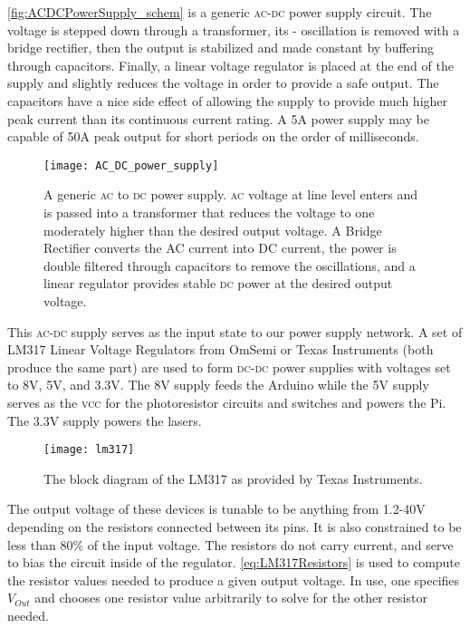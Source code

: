 \documentclass[11pt,oneside,final,letterpaper]{memoir}
\begin{document}
\autoref{fig:ACDCPowerSupply_schem} is a generic \textsc{ac-dc} power supply circuit.  The voltage is stepped down through a transformer, its - oscillation is removed with a bridge rectifier, then the output is stabilized and made constant by buffering through capacitors.  Finally, a linear voltage regulator is placed at the end of the supply and slightly reduces the voltage in order to provide a safe output.  The capacitors have a nice side effect of allowing the supply to provide much higher peak current than its continuous current rating.  A 5A power supply may be capable of 50A peak output for short periods on the order of milliseconds.

\begin{figure}[H]
    \centering
    \texttt{[image: AC\_DC\_power\_supply]}
    \caption[Generic AC-DC power supply]{
        A generic \textsc{ac} to \textsc{dc} power supply.  \textsc{ac} voltage at line level enters and is passed into a transformer that reduces the voltage to one moderately higher than the desired output voltage.  A Bridge Rectifier converts the AC current into DC current, the power is double filtered through capacitors to remove the oscillations, and a linear regulator provides stable \textsc{dc} power at the desired output voltage.
    } \label{fig:ACDCPowerSupply_schem}
\end{figure}

This \textsc{ac-dc} supply serves as the input state to our power supply network.  A set of LM317 Linear Voltage Regulators from OmSemi or Texas Instruments (both produce the same part) are used to form \textsc{dc-dc} power supplies with voltages set to 8V, 5V, and 3.3V.  The 8V supply feeds the Arduino while the 5V supply serves as the \textsc{vcc} for the photoresistor circuits and switches and powers the Pi.  The 3.3V supply powers the lasers.

\begin{figure}[H]
    \centering
    \texttt{[image: lm317]}
    \caption[Texas Instruments LM317 Block Diagram]{
        The block diagram of the LM317 as provided by Texas Instruments.
    } \label{fig:LM317_schem}
\end{figure}

The output voltage of these devices is tunable to be anything from 1.2-40V depending on the resistors connected between its pins.  It is also constrained to be less than 80\% of the input voltage.  The resistors do not carry current, and serve to bias the circuit inside of the regulator. \autoref{eq:LM317Resistors} is used to compute the resistor values needed to produce a given output voltage.  In use, one specifies $V_{Out}$ and chooses one resistor value arbitrarily to solve for the other resistor needed.
\end{document}
